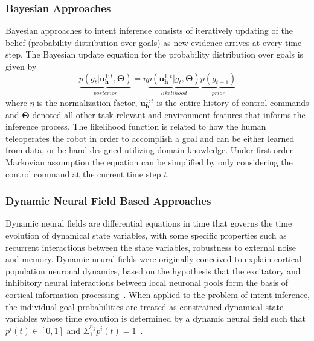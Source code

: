 \documentclass[conference]{IEEEtran}
\begin{document}
\subsubsection{Bayesian Approaches}
Bayesian approaches to intent inference consists of iteratively updating of the belief (probability distribution over goals) as new evidence arrives at every time-step. The Bayesian update equation for the probability distribution over goals is given by
\begin{equation*}
\underbrace{p(g_t| \boldsymbol{u}^{1:t}_{\boldsymbol{h}}, \boldsymbol{\Theta})}_{posterior} = \eta \underbrace{p(\boldsymbol{u}^{1:t}_{\boldsymbol{h}} | g_t, \boldsymbol{\Theta})}_{likelihood}\underbrace{p(g_{t-1})}_{prior}
\end{equation*}
where $\eta$ is the normalization factor, $\boldsymbol{u}^{1:t}_{\boldsymbol{h}}$ is the entire history of control commands and $\boldsymbol{\Theta}$ denoted all other task-relevant and environment features that informs the inference process. The likelihood function is related to how the human teleoperates the robot in order to accomplish a goal and can be either learned from data, or be hand-designed utilizing domain knowledge. Under first-order Markovian assumption the equation can be simplified by only considering the control command at the current time step $t$. 
\subsubsection{Dynamic Neural Field Based Approaches}
Dynamic neural fields are differential equations in time that governs the time evolution of dynamical state variables, with some specific properties such as recurrent interactions between the state variables, robustness to external noise and memory. Dynamic neural fields were originally conceived to explain cortical population neuronal dynamics, based on the hypothesis that the excitatory and inhibitory neural interactions between local neuronal pools form the basis of cortical information processing~\citep{schoner2008dynamical, schoner1995dynamics}. 
When applied to the problem of intent inference, the individual goal probabilities are treated as constrained dynamical state variables whose time evolution is determined by a dynamic neural field such that $p^i(t) \in [0, 1]$ and $\Sigma_{1}^{n_g}p^{i}(t) = 1$~\citep{gopinath2017disamb}. 
\end{document}
